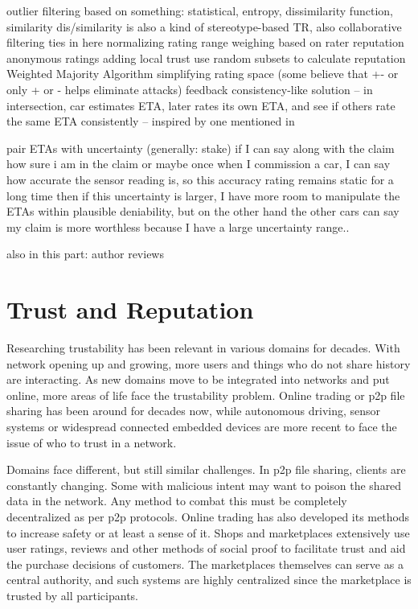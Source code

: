 \documentclass[%
    ]{\PathToTumTemplate/thesis/tum_thesis}
\begin{document}
outlier filtering based on something: statistical, entropy, dissimilarity function, similarity
dis/similarity is also a kind of stereotype-based TR, also collaborative filtering ties in here
normalizing rating range
weighing based on rater reputation
anonymous ratings
adding local trust
use random subsets to calculate reputation
Weighted Majority Algorithm 
simplifying rating space (some believe that +- or only + or - helps eliminate attacks)
feedback consistency-like solution -- in intersection, car estimates ETA, later rates its own ETA, and see if others rate the same ETA consistently -- inspired by one mentioned in \cite{azzedin_identifying_2010}

pair ETAs with uncertainty (generally: stake)
if I can say along with the claim how sure i am in the claim
or maybe once when I commission a car, I can say how accurate the sensor reading is, so this accuracy rating remains static for a long time
then if this uncertainty is larger, I have more room to manipulate the ETAs within plausible deniability, but on the other hand the other cars can say my claim is more worthless because I have a large uncertainty range..

also in this part: author reviews
\fi







\section{Trust and Reputation}

Researching trustability has been relevant in various domains for decades.
With network opening up and growing, more users and things who do not share history are interacting.
As new domains move to be integrated into networks and put online, more areas of life face the trustability problem.
Online trading or \gls{p2p} file sharing has been around for decades now, while autonomous driving, sensor systems or widespread connected embedded devices are more recent to face the issue of who to trust in a network.

Domains face different, but still similar challenges.
In \gls{p2p} file sharing, clients are constantly changing.
Some with malicious intent may want to poison the shared data in the network.\cite{kamvar_eigentrust_2003}
Any method to combat this must be completely decentralized as per \gls{p2p} protocols.
Online trading has also developed its methods to increase safety or at least a sense of it.
Shops and marketplaces extensively use user ratings, reviews and other methods of social proof to facilitate trust and aid the purchase decisions of customers.
The marketplaces themselves can serve as a central authority, and such systems are highly centralized since the marketplace is trusted by all participants\cite{josang_trust_2007}.
\end{document}

